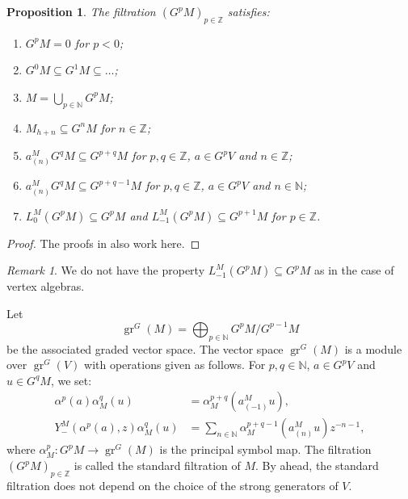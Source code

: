 \documentclass[a4paper, 12pt, reqno]{amsart}
\newtheorem{proposition}[theorem]{Proposition}
\theoremstyle{remark}
\newtheorem{remark}[theorem]{Remark}
\DeclareMathOperator{\gr}{gr}
\begin{document}
\begin{proposition}
  \label{prp:18}
  The filtration $(G^pM)_{p \in \mathbb{Z}}$ satisfies:
  \begin{enumerate}
  \item $G^pM = 0$ for $p < 0$;
  \item $G^0M \subseteq G^1M \subseteq \dots$;
  \item $M = \bigcup_{p \in \mathbb{N}}G^pM$;
  \item $M_{h + n} \subseteq G^nM$ for $n \in \mathbb{Z}$;
  \item $a^M_{(n)}G^qM \subseteq G^{p + q}M$ for $p, q \in \mathbb{Z}$, $a \in G^pV$ and $n \in \mathbb{Z}$;
  \item $a^M_{(n)}G^qM \subseteq G^{p + q - 1}M$ for $p, q \in \mathbb{Z}$, $a \in G^pV$ and $n \in \mathbb{N}$;
  \item $L^M_0(G^pM) \subseteq G^pM$ and $L^M_{-1}(G^pM) \subseteq G^{p + 1}M$ for $p \in \mathbb{Z}$.
  \end{enumerate}
\end{proposition}

\begin{proof}
  The proofs in \cite{li_vertex_2004} also work here.
\end{proof}

\begin{remark}
  \label{rmk:42}
  We do not have the property $L_{-1}^M(G^pM) \subseteq G^pM$ as in the case of vertex algebras.
\end{remark}

Let
\begin{equation*}
  \gr^G(M) = \bigoplus_{p \in \mathbb{N}}G^pM/G^{p - 1}M
\end{equation*}
be the associated graded vector space.
The vector space $\gr^G(M)$ is a module over $\gr^G(V)$ with operations given as follows.
For $p, q \in \mathbb{N}$, $a \in G^pV$ and $u \in G^qM$, we set:
\begin{align*}
  \alpha^p(a)\alpha_M^q(u) &= \alpha_M^{p + q}(a^M_{(-1)}u), \\
  Y^M_-(\alpha^p(a), z)\alpha_M^q(u) &= \sum_{n \in \mathbb{N}}\alpha_M^{p + q - 1}(a^M_{(n)}u)z^{-n - 1},
\end{align*}
where $\alpha_M^p: G^pM \to \gr^G(M)$ is the principal symbol map.
The filtration $(G^pM)_{p \in \mathbb{Z}}$ is called the standard filtration of $M$.
By  ahead, the standard filtration does not depend on the choice of the strong generators of $V$.
\end{document}
